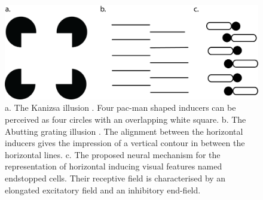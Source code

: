 \documentclass[12pt]{article}
\begin{document}
\begin{figure}[H]
    \centering
    \includegraphics[width=1.0\textwidth]{adjusted_figures/illusory_figure.png}
    \caption{a. The Kanizsa illusion \autocite{kanizsaSubjectiveContours1976}. Four pac-man shaped inducers can be perceived as four circles with an overlapping white square. b. The Abutting grating illusion \autocite{sorianoAbuttingGratingIllusion1996}. The alignment between the horizontal inducers gives the impression of a vertical contour in between the horizontal lines. c. The proposed neural mechanism for the representation of horizontal inducing visual features named endstopped cells. Their receptive field is characterised by an elongated excitatory field and an inhibitory end-field.}
    \label{fig:figure_1}
\end{figure}
\end{document}
